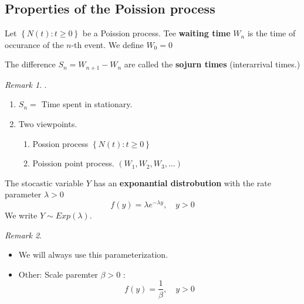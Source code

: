 \documentclass{article}
\theoremstyle{remark}
\newtheorem*{remark}{Remark}
\newcommand{\newpara}
  {
  \vskip 0.4cm
  }
\begin{document}
\subsection{Properties of the Poission process}%
\label{sub:properties_of_the_poission_process}

\begin{definition}
  Let $\left\{ N\left( t \right): t \ge 0 \right\}$ be a Poission process.  Tee \textbf{waiting time } $W_{n}$  is the time of occurance of the $n$-th event. We define $W_{0} = 0$
\end{definition}

\begin{definition}
  The difference $S_{n} = W_{n+1} - W_{n}$ are called the \textbf{sojurn times }  (interarrival times.)
\end{definition}

\begin{remark}.
 \newpara
  \begin{enumerate}[label=(\roman*)]
    \item $\displaystyle S_{n} = $ Time spent in stationary.
    \item Two viewpoints. 
    \begin{enumerate}[label=(\alph*)]
      \item Possion process $\left\{ N\left( t \right):  t\ge 0  \right\}$
      \item Poission point process. $\left( W_{1}, W_{2}, W_{3}, \ldots \right)$
    \end{enumerate}
  \end{enumerate}
\end{remark}

\begin{definition}
  The stocastic variable $Y$ has an \textbf{exponantial distrobution }  with the rate parameter $\lambda  > 0$ \[
  f\left( y \right) = \lambda  e^{-\lambda  y} , \quad  y>0  
  \] 
  We write $Y \sim Exp \left( \lambda  \right)$.
\end{definition}



\begin{remark}
  \begin{itemize}
    \item
  We will always use this parameterization.
\item Other: Scale paremter $\beta > 0$ : \[
f\left( y \right) = \frac{1}{\beta } , \quad  y> 0 
\] 
  \end{itemize}

\end{remark}
\end{document}
